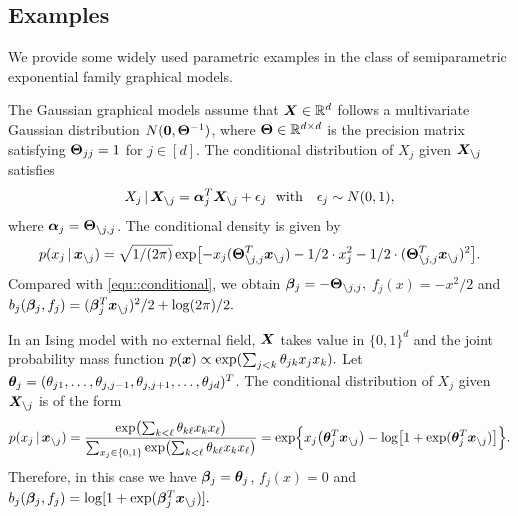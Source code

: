 \documentclass[twoside,11pt]{article}
\newcommand*{\BR}{\mathbb{R}}
\begin{document}
\subsection{Examples} 

We provide some widely used parametric examples in the class  of semiparametric exponential family graphical models.

\vspace{5pt}
 The Gaussian graphical models assume that $\bX\in \BR^d $ follows a multivariate Gaussian distribution $ N(\bm{0}, \bm{\Theta}^{-1})$, where  $ \bTheta\in\BR^{d\times d}$ is the precision matrix satisfying $\bm{\Theta}_{jj} = 1$ for $j\in [d]$. The conditional distribution of $X_j$ given $\bm{X}_{\setminus j}$ satisfies 
$$
X_j {\,|\,}  \bm{X}_{\setminus j} =  \bm{\alpha}_j^T  \bm{X}_{\setminus j} + \epsilon_j~~\text {with} \quad \epsilon_j \sim N(0, 1),
$$
where $\bm{\alpha}_j  =  \bm{\Theta}_{\setminus j,j }$. 
The conditional density is given by
$$
p  (x_j  {\,|\,}   \bm{x} _{\setminus j} ) =  \sqrt{1/(2\pi)} \exp\bigl[  - x_j (\bm{\Theta}_{\setminus j, j}^T \bm{x}_{\setminus j} ) - 1/2\cdot x_j^2  - 1/2\cdot(\bm{\Theta}_{\setminus j, j}^T \bm{x}_{\setminus j} )^2 \bigr].
$$
Compared with \eqref{equ::conditional}, we obtain   $\bm{\beta}_{j} = -\bm{\Theta}_{\setminus j, j},$ $f_j(x) = - x^2/2$ and $b_j(\bm{\beta}_j,f_j) =   (\bm{\beta}_j^T \bm{x}_{\setminus j} )^2/2 +  \log (2\pi)/2.$

\vspace{5pt}
In an Ising model with no external field, $\bm{X}$ takes value in $\{0,1\}^{d}$ and the joint probability mass function  $p (\bm{x}) \propto \exp ( \sum_{j<k} \theta_{jk} x_j x_k).$ Let $\bm{\theta}_j = (\theta_{j1},\ldots, \theta_{j,j-1}, \theta_{j,j+1},\ldots, \theta_{jd})^T$.  The conditional distribution of $X_j$  given $\bm{X}_{\setminus j} $ is of the form
$$
p (x_j {\,|\,} \bm{x}_{\setminus j} ) = \frac{ \exp \bigl ( \sum_{k<\ell} \theta_{k\ell} x_k x_\ell\bigr ) } { \sum_{x_j \in  \{0,1\}} \exp \bigl ( \sum_{k<\ell } \theta_{k\ell } x_k x_\ell\bigr  )  } = \exp \Bigl\{ x_j \bigl(\bm{\theta}_{j}^T \bm{x}_{\setminus j}\bigr) - \log \bigl [ 1 + \exp(\bm{\theta}_{j}^T \bm{x}_{\setminus j})\bigr]\Bigr \}.
$$
Therefore, in this case  we have $\bm{\beta}_{j} = \bm{\theta}_{j}$, $f_j(x) = 0$  and $b_j(\bm{\beta}_j,f_j ) = \log [1 + \exp(\bm{\beta}_{j}^T \bm{x}_{\setminus j})].$
\end{document}
